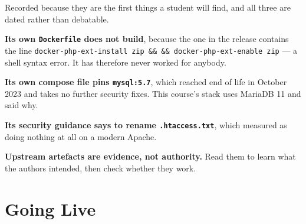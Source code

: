 \begin{alertbox}
Recorded because they are the first things a student will find, and all three
are dated rather than debatable.

\begin{tight}
  \item \textbf{Its own \texttt{Dockerfile} does not build}, because the one
        in the release contains the line
        \texttt{docker-php-ext-install zip \&\& \&\& docker-php-ext-enable
        zip} --- a shell syntax error. It has therefore never worked for
        anybody.
  \item \textbf{Its own compose file pins \texttt{mysql:5.7}}, which reached
        end of life in October 2023 and takes no further security fixes. This
        course's stack uses MariaDB 11 and  said why.
  \item \textbf{Its security guidance says to rename \texttt{.htaccess.txt}},
        which  measured as doing nothing at all on a modern
        Apache.
\end{tight}

\smallskip
\textbf{Upstream artefacts are evidence, not authority.} Read them to learn what
the authors intended, then check whether they work.
\end{alertbox}

\section{Going Live}

